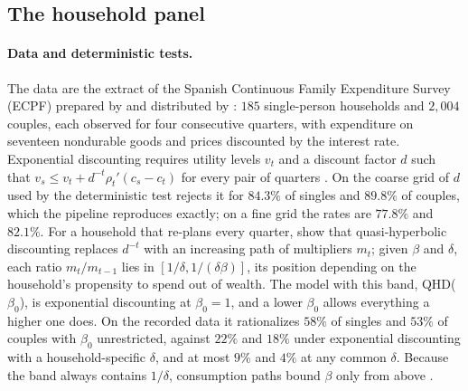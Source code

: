 \documentclass[11pt,a4paper]{article}
\theoremstyle{plain}
\theoremstyle{definition}
\begin{document}
\subsection{The household panel}
\label{app:ecpf}

\paragraph{Data and deterministic tests.} The data are the extract of the Spanish Continuous Family Expenditure
Survey (ECPF) prepared by \citet{adams2014} and distributed by \citet{aguiar2021}: $185$ single-person households and
$2{,}004$ couples, each observed for four consecutive quarters, with expenditure on seventeen nondurable goods and
prices discounted by the interest rate. Exponential discounting requires utility levels $v_t$ and a discount factor
$d$ such that $v_s\le v_t+d^{-t}\rho_t'(c_s-c_t)$ for every pair of quarters \citep{browning1989}. On the coarse grid
of $d$ used by \citet{aguiar2021} the deterministic test rejects it for $84.3\%$ of singles and $89.8\%$ of couples,
which the pipeline reproduces exactly; on a fine grid the rates are $77.8\%$ and $82.1\%$. For a household that
re-plans every quarter, \citet[Proposition~1]{bbc2021} show that quasi-hyperbolic discounting replaces $d^{-t}$ with
an increasing path of multipliers $m_t$; given $\beta$ and $\delta$, each ratio $m_t/m_{t-1}$ lies in
$[1/\delta,1/(\delta\beta)]$, its position depending on the household's propensity to spend out of wealth. The model
with this band, QHD($\beta_0$), is exponential discounting at $\beta_0=1$, and a lower $\beta_0$ allows everything a
higher one does. On the recorded data it rationalizes $58\%$ of singles and $53\%$ of couples with $\beta_0$
unrestricted, against $22\%$ and $18\%$ under exponential discounting with a household-specific $\delta$, and at
most $9\%$ and $4\%$ at any common $\delta$. Because the band always contains $1/\delta$, consumption paths bound
$\beta$ only from above \citep[Corollary~3]{bbc2021}.
\end{document}
